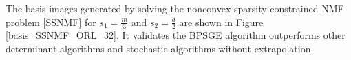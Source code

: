 \documentclass[letterpaper]{article} %
\begin{document}





	The basis images generated by solving the nonconvex sparsity constrained NMF problem \eqref{SSNMF} for $s_{1}=\frac{m}{3}$ and $s_{2}=\frac{d}{2}$ are shown in Figure \ref{basis_SSNMF_ORL_32}. It validates the BPSGE algorithm outperforms other determinant algorithms and stochastic algorithms without extrapolation.
\end{document}
